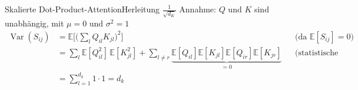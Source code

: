 \documentclass[aspectratio=169,10pt]{beamer}
\begin{document}
\begin{frame}{Skalierte Dot-Product-Attention}{Herleitung $\frac{1}{\sqrt{d_K}}$}
    Annahme: $Q$ und $K$ sind unabhängig, mit $\mu=0$ und $\sigma^2=1$
    \begin{align*}
        \operatorname{Var}(S_{ij})
        &= \mathbb{E}\Big[\Big(\textstyle\sum_{l} Q_{il}K_{jl}\Big)^2\Big]
        && \text{(da } \mathbb{E}[S_{ij}] = 0\text{)} \\
        &= \textstyle\sum_{l}\mathbb{E}[Q_{il}^2]\,\mathbb{E}[K_{jl}^2]
        + \sum_{l\neq r}\underbrace{\mathbb{E}[Q_{il}]\mathbb{E}[K_{jl}]\mathbb{E}[Q_{ir}]\mathbb{E}[K_{jr}]}_{=0}
        && \text{(statistische Unabhängigkeit)} \\
        &= \textstyle\sum_{l=1}^{d_k} 1 \cdot 1 = d_k
    \end{align*}
\end{frame}
\end{document}
